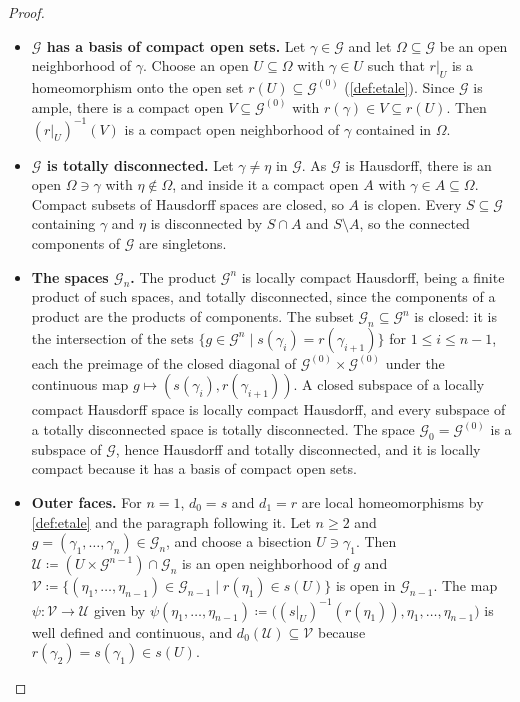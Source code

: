 \documentclass{extracta-temp-26}
\makeatletter
\numberwithin{equation}{section}
\theoremstyle{definition}
\theoremstyle{remark}
\newcommand{\G}{\mathcal{G}}
\newcommand{\restr}[2]{#1\rvert_{#2}}
\newcommand{\step}[1]{\textbf{#1}}
\newcommand{\keepwithnext}{\leavevmode\par\nobreak\@afterheading}
\makeatother
\begin{document}
\begin{proof}\keepwithnext
\begin{itemize}
\item \step{\(\G\) has a basis of compact open sets.}
Let \(\gamma\in\G\) and let \(\Omega\subseteq\G\) be an open neighborhood of \(\gamma\).
Choose an open \(U\subseteq\Omega\) with \(\gamma\in U\) such that \(\restr{r}{U}\) is a homeomorphism onto the open set \(r(U)\subseteq\G^{(0)}\) (\cref{def:etale}).
Since \(\G\) is ample, there is a compact open \(V\subseteq\G^{(0)}\) with \(r(\gamma)\in V\subseteq r(U)\).
Then \((\restr{r}{U})^{-1}(V)\) is a compact open neighborhood of \(\gamma\) contained in \(\Omega\).
\item \step{\(\G\) is totally disconnected.}
Let \(\gamma\neq\eta\) in \(\G\).
As \(\G\) is Hausdorff, there is an open \(\Omega\ni\gamma\) with \(\eta\notin\Omega\), and inside it a compact open \(A\) with \(\gamma\in A\subseteq\Omega\).
Compact subsets of Hausdorff spaces are closed, so \(A\) is clopen.
Every \(S\subseteq\G\) containing \(\gamma\) and \(\eta\) is disconnected by \(S\cap A\) and \(S\setminus A\), so the connected components of \(\G\) are singletons.
\item \step{The spaces \(\G_n\).}
The product \(\G^n\) is locally compact Hausdorff, being a finite product of such spaces, and totally disconnected, since the components of a product are the products of components.
The subset \(\G_n\subseteq\G^n\) is closed: it is the intersection of the sets \(\{g\in\G^n\mid s(\gamma_i)=r(\gamma_{i+1})\}\) for \(1\le i\le n-1\), each the preimage of the closed diagonal of \(\G^{(0)}\times\G^{(0)}\) under the continuous map \(g\mapsto(s(\gamma_i),r(\gamma_{i+1}))\).
A closed subspace of a locally compact Hausdorff space is locally compact Hausdorff, and every subspace of a totally disconnected space is totally disconnected.
The space \(\G_0=\G^{(0)}\) is a subspace of \(\G\), hence Hausdorff and totally disconnected, and it is locally compact because it has a basis of compact open sets.
\item \step{Outer faces.}
For \(n=1\), \(d_0=s\) and \(d_1=r\) are local homeomorphisms by \cref{def:etale} and the paragraph following it.
Let \(n\ge 2\) and \(g=(\gamma_1,\dots,\gamma_n)\in\G_n\), and choose a bisection \(U\ni\gamma_1\).
Then \(\mathcal U\coloneqq(U\times\G^{n-1})\cap\G_n\) is an open neighborhood of \(g\) and \(\mathcal V\coloneqq\{(\eta_1,\dots,\eta_{n-1})\in\G_{n-1}\mid r(\eta_1)\in s(U)\}\) is open in \(\G_{n-1}\).
The map \(\psi\colon\mathcal V\to\mathcal U\) given by \(\psi(\eta_1,\dots,\eta_{n-1})\coloneqq\bigl((\restr{s}{U})^{-1}(r(\eta_1)),\eta_1,\dots,\eta_{n-1}\bigr)\) is well defined and continuous, and \(d_0(\mathcal U)\subseteq\mathcal V\) because \(r(\gamma_2)=s(\gamma_1)\in s(U)\).

\end{itemize}
\end{proof}
\end{document}
